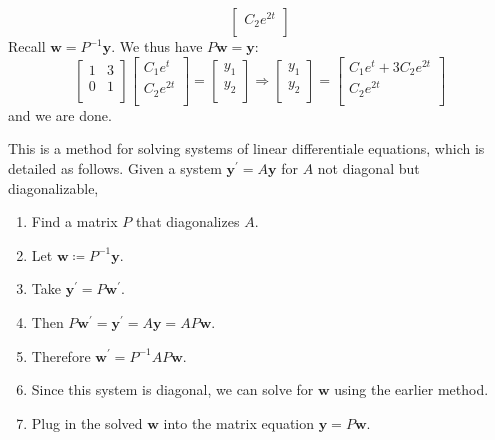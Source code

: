 \begin{longsolution}
\[\begin{bmatrix}
          C_2 e^{2t} \\
    \end{bmatrix}
\]
Recall \(\mathbf{w} =P ^{-1}  \mathbf{y} \). We thus have \(P \mathbf{w} =\mathbf{y}\):
\[
    \begin{bmatrix}
        1 &3   \\
         0&1   \\
    \end{bmatrix} \begin{bmatrix}
         C_1 e^t \\
          C_2 e^{2t} \\
    \end{bmatrix} = \begin{bmatrix}
         y_1 \\
          y_2\\
    \end{bmatrix} \Longrightarrow \begin{bmatrix}
         y_1 \\
          y_2\\
    \end{bmatrix} = \begin{bmatrix}
         C_1 e^t + 3C_2 e^{2t}  \\
          C_2 e^{2t} \\
    \end{bmatrix}
\]
and we are done.
\end{longsolution}
This is a method for solving systems of linear differentiale equations, which is detailed as follows. Given a system \(\mathbf{y} ^{\prime} =A \mathbf{y} \) for \(A\) not diagonal but diagonalizable,
\begin{enumerate}
    \item Find a matrix \(P\) that diagonalizes \(A\).
    \item Let \(\mathbf{w} \coloneqq P ^{-1} \mathbf{y} \).
    \item Take \(\mathbf{y} ^{\prime} =P \mathbf{w} ^{\prime} \).
    \item Then \(P \mathbf{w} ^{\prime} =\mathbf{y} ^{\prime} =A \mathbf{y} = AP \mathbf{w}  \).
    \item Therefore \(\mathbf{w} ^{\prime} = P ^{-1} AP \mathbf{w} \).
    \item Since this system is diagonal, we can solve for \(\mathbf{w}\) using the earlier method.
    \item Plug in the solved \(\mathbf{w}  \) into the matrix equation \(\mathbf{y} =P \mathbf{w} \).
\end{enumerate}
